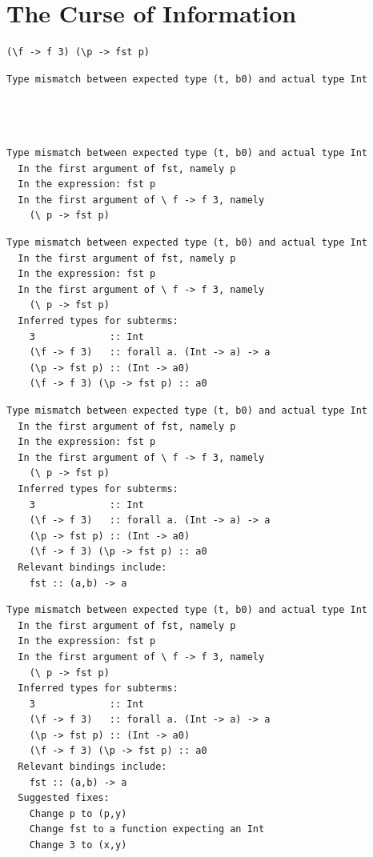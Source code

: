 \documentclass[xcolor=svgnames,12pt,aspectratio=169]{beamer}
\newenvironment{xframe}[1][]
  {\begin{frame}[fragile,environment=xframe,#1]}
  {\end{frame}}
\begin{document}
\section{The Curse of Information}

\begin{xframe}{}
  \begin{center}
\begin{BVerbatim}
(\f -> f 3) (\p -> fst p)
\end{BVerbatim}
\medskip

\begin{overprint}
    \begin{Verbatim}
Type mismatch between expected type (t, b0) and actual type Int




    \end{Verbatim}

\begin{Verbatim}
Type mismatch between expected type (t, b0) and actual type Int
  In the first argument of fst, namely p
  In the expression: fst p
  In the first argument of \ f -> f 3, namely
    (\ p -> fst p)
\end{Verbatim}

\begin{Verbatim}
Type mismatch between expected type (t, b0) and actual type Int
  In the first argument of fst, namely p
  In the expression: fst p
  In the first argument of \ f -> f 3, namely
    (\ p -> fst p)
  Inferred types for subterms:
    3             :: Int
    (\f -> f 3)   :: forall a. (Int -> a) -> a
    (\p -> fst p) :: (Int -> a0)
    (\f -> f 3) (\p -> fst p) :: a0
\end{Verbatim}

\begin{Verbatim}
Type mismatch between expected type (t, b0) and actual type Int
  In the first argument of fst, namely p
  In the expression: fst p
  In the first argument of \ f -> f 3, namely
    (\ p -> fst p)
  Inferred types for subterms:
    3             :: Int
    (\f -> f 3)   :: forall a. (Int -> a) -> a
    (\p -> fst p) :: (Int -> a0)
    (\f -> f 3) (\p -> fst p) :: a0
  Relevant bindings include:
    fst :: (a,b) -> a
\end{Verbatim}

\begin{Verbatim}[fontsize=\footnotesize]
Type mismatch between expected type (t, b0) and actual type Int
  In the first argument of fst, namely p
  In the expression: fst p
  In the first argument of \ f -> f 3, namely
    (\ p -> fst p)
  Inferred types for subterms:
    3             :: Int
    (\f -> f 3)   :: forall a. (Int -> a) -> a
    (\p -> fst p) :: (Int -> a0)
    (\f -> f 3) (\p -> fst p) :: a0
  Relevant bindings include:
    fst :: (a,b) -> a
  Suggested fixes:
    Change p to (p,y)
    Change fst to a function expecting an Int
    Change 3 to (x,y)
\end{Verbatim}


\end{overprint}
\end{center}
\end{xframe}
\end{document}
